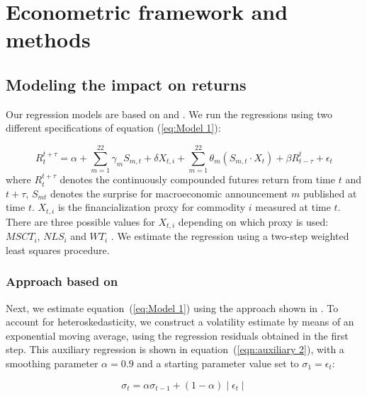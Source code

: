 \section{Econometric framework and methods}
\subsection{Modeling the impact on returns}\label{return}


Our regression models are based on \citet{kurov2019price} and \citet{andersen2007real}. We run the regressions using two different specifications of equation (\ref{eq:Model 1}):

\begin{equation}\label{eq:Model 1}
R_{t}^{t+\tau}=\alpha+\sum_{m=1}^{22} \gamma_m S_{m,t}+ \delta X_{t,i} + \sum_{m=1}^{22} \theta_m (S_{m,t} \cdot X_t)+\beta R_{t-\tau}^{t}+\epsilon_{t} 
\end{equation}
where  $R_{t}^{t+\tau}$ denotes the continuously compounded futures return from time $t$ and $t+\tau$, $S_{mt}$ denotes the surprise for macroeconomic announcement $m$ published at time $t$. $X_{t,i}$ is the financialization proxy for commodity  $i$ measured at time $t$. There are three possible values for  $X_{t,i}$ depending on which proxy is used: $MSCT_i$, $NLS_i$ and $WT_i$ . %
We estimate the regression using a two-step weighted least squares procedure.

\subsubsection{Approach based on \citet*{kurov2019price}}

Next, we estimate equation~(\ref{eq:Model 1}) using the approach shown in \citet{kurov2019price}. To account for heteroskedasticity, we construct a volatility estimate by means of an exponential moving average, using the regression residuals obtained in the first step. This auxiliary regression is shown in equation~(\ref{eqn:auxiliary 2}), with a smoothing parameter $\alpha=0.9$ and a starting parameter value set to  $\sigma_1=\epsilon_t$:

\begin{equation}\label{eqn:auxiliary 2}
\sigma_t=\alpha \sigma_{t-1}+(1-\alpha) \mid \epsilon_t \mid 
\end{equation} 


